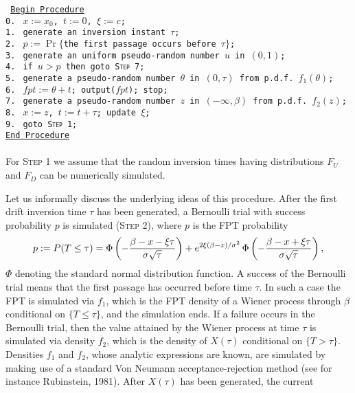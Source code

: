 {\small \tt
\underline{Begin Procedure} \\
\textsc{0.}$\;$ $x:=x_0$, $t:=0$, $\xi:=c$; \\
\textsc{1.}$\;$ generate an inversion instant $\tau$; \\
\textsc{2.}$\;$ $p:= \Pr\{$the first passage occurs
before $\tau\}$; \\
\textsc{3.}$\;$ generate an uniform pseudo-random
number $u$ in $(0,1)$; \\
\textsc{4.}$\;$ if $u>p$ then goto \textsc{Step~7}; \\
\textsc{5.}$\;$ generate a pseudo-random number $\theta$
in $(0,\tau)$ from p.d.f.\ $f_1(\theta)$; \\
\textsc{6.}$\;$ $fpt:=\theta+t$; output($fpt$); stop; \\
\textsc{7.}$\;$ generate a pseudo-random number $z$
in $(-\infty,\beta)$ from p.d.f.\ $f_2(z)$; \\
\textsc{8.}$\;$ $x:=z$, $t:=t+\tau$; update $\xi$; \\
\textsc{9.}$\;$ goto \textsc{Step~1}; \\
\underline{End Procedure}
}
%
\\ \smallskip \\
For \textsc{Step 1} we assume that the random inversion times having distributions 
$F_U$ and $F_D$ can be numerically simulated.
\par
Let us informally discuss the underlying ideas of this procedure. After the first
drift inversion time $\tau$ has been generated, a Bernoulli trial with success probability
$p$ is simulated (\textsc{Step 2}), where $p$ is the FPT probability
$$ p:=P(T\leq \tau)=\Phi\left(-\displaystyle{\beta-x-\xi \tau\over \sigma\sqrt{\tau}}\right)  + e^{2\xi(\beta-x)/\sigma^2}\,
 \Phi\left(-\displaystyle{\beta-x+\xi \tau\over \sigma\sqrt{\tau}}\right),$$
$\Phi$ denoting the standard normal distribution function. A success of the Bernoulli 
trial means that the first passage has occurred before time $\tau$. In such a case the 
FPT is simulated via $f_1$, which is the FPT density of a Wiener process through $\beta$ 
conditional on $\{T\leq \tau\}$, and the simulation ends. If a failure occurs in the 
Bernoulli trial, then the value attained by the Wiener process at time $\tau$ is 
simulated via density $f_2$, which is the density of $X(\tau)$ conditional on 
$\{T>\tau\}$. Densities $f_1$ and $f_2$, whose analytic expressions are known, 
are simulated by making use of a standard Von Neumann acceptance-rejection method 
(see for instance Rubinstein, 1981). After $X(\tau)$ has been generated, the current 
